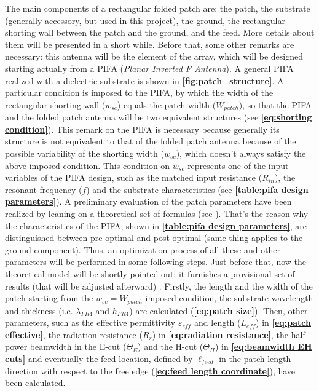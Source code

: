\documentclass[10 pt,a4paper,twocolumn]{article}
\begin{document}
{The main components of a rectangular folded patch are: the patch, the substrate (generally accessory, but used in this project), the ground, the rectangular shorting wall between the patch and the ground, and the feed. More details about them will be presented in a short while. Before that, some other remarks are necessary: this antenna will be the element of the array, which will be designed starting actually from a PIFA (\emph{Planar Inverted F Antenna}).
A general PIFA realized with a dielectric substrate is shown in \textbf{\cref{fig:patch_structure}}. A particular condition is imposed to the PIFA, by which the width of the rectangular shorting wall ($w_{sc}$) equals the patch width ($W_{patch}$), so that the PIFA and the folded patch antenna will be two equivalent structures (see \textbf{\cref{eq:shorting condition}}). This remark on the PIFA is necessary because generally its structure is not equivalent to that of the folded patch antenna because of the possible variability of the shorting width ($w_{sc}$), which doesn't always satisfy the above imposed condition. This condition on $w_{sc}$ represents one of the input variables of the PIFA design, such as the matched input resistance ($R_{in}$), the resonant frequency ($f$) and the substrate characteristics (see \textbf{\cref{table:pifa design parameters}}). A preliminary evaluation of the patch parameters have been realized by leaning on a theoretical set of formulas (see \textbf{\cite{Balanis1}}). That's the reason why the characteristics of the PIFA, shown in \textbf{\cref{table:pifa design parameters}}, are distinguished between pre-optimal and post-optimal (same thing applies to the ground component). Thus, an optimization process of all these and other parameters will be performed in some following steps. Just before that, now the theoretical model will be shortly pointed out: it furnishes a provisional set of results (that will be adjusted afterward) . Firstly, the length and the width of the patch starting from the $w_{sc}=W_{patch}$ imposed condition, the substrate wavelength and thickness (i.e. $\lambda_{FR4}$ and $h_{FR4}$) are calculated (\textbf{\cref{eq:patch size}}). Then, other parameters, such as the effective permittivity $\varepsilon_{eff}$  and length ($L_{eff}$) in \textbf{\cref{eq:patch effective}}, the radiation resistance ($R_r$) in \textbf{\cref{eq:radiation resistance}}, the half-power beamwidth in the E-cut ($\Theta_E$) and the H-cut ($\Theta_H$) in \textbf{\cref{eq:beamwidth EH cuts}} and eventually the feed location, defined by $\ell_{feed}$ in the patch length direction with respect to the free edge (\textbf{\cref{eq:feed length coordinate}}), have been calculated. 
}
\end{document}
